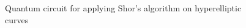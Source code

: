 \begin{figure}[!htb]
\centering
\resizebox{\linewidth}{!}{}
\caption{Quantum circuit for applying Shor's algorithm on hyperelliptic curves}
\label{fig:HECDLPCircuit}
\end{figure}